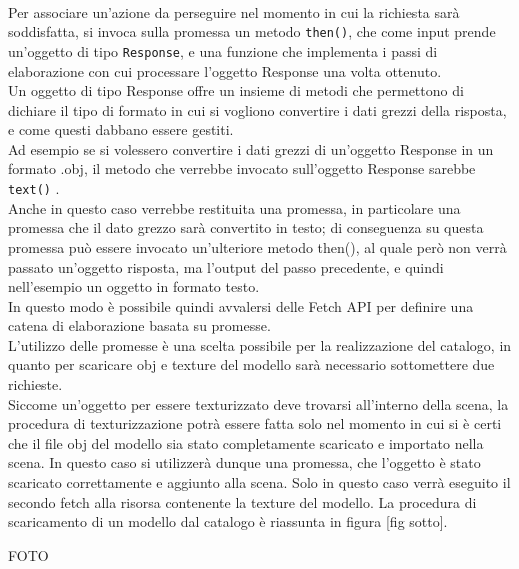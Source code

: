 \\ 
Per associare un’azione da perseguire nel momento in cui la richiesta sarà soddisfatta, si invoca sulla promessa un metodo \texttt{then()}, che come input prende un’oggetto di tipo \texttt{Response}, e una funzione che implementa i passi di elaborazione con cui processare l’oggetto Response una volta ottenuto.
\\
Un oggetto di tipo Response offre un insieme di metodi che permettono di dichiare il tipo di formato in cui si vogliono convertire i dati grezzi della risposta, e come questi dabbano essere gestiti.
\\
Ad esempio se si volessero convertire i dati grezzi di un’oggetto Response in un formato .obj, il metodo che verrebbe invocato sull’oggetto Response sarebbe \texttt{text()} . 
\\
Anche in questo caso verrebbe restituita una promessa, in particolare una promessa che il dato grezzo sarà convertito in testo; di conseguenza su questa promessa può essere invocato un’ulteriore metodo then(), al quale però non verrà passato un’oggetto risposta, ma l’output del passo precedente, e quindi nell’esempio un oggetto in formato testo.
\\ 
In questo modo è possibile quindi avvalersi delle Fetch API per definire una catena di elaborazione basata su promesse.
\\  
L’utilizzo delle promesse è una scelta possibile per la realizzazione del catalogo, in quanto per scaricare obj e texture del modello sarà necessario sottomettere due richieste.
\\
Siccome un’oggetto per essere texturizzato deve trovarsi all’interno della scena, la procedura di texturizzazione potrà essere fatta solo nel momento in cui si è certi che il file obj del modello sia stato completamente scaricato e importato nella scena. In questo caso si utilizzerà dunque una promessa, che l’oggetto è stato scaricato correttamente e aggiunto alla scena. Solo in questo caso verrà eseguito il secondo fetch alla risorsa contenente la texture del modello.
La procedura di scaricamento di un modello dal catalogo è riassunta in figura [fig sotto].

FOTO

